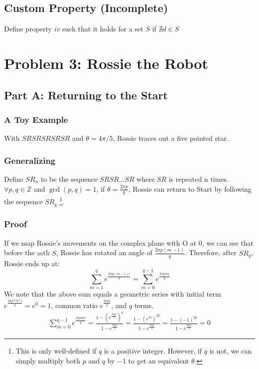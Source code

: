 \documentclass{article}
\begin{document}
  \subsection{Custom Property (Incomplete)}
  Define property $iv$ such that it holds for a set $S$ if $\nexists d \in S$
  \section{Problem 3: Rossie the Robot}
  \subsection{Part A: Returning to the Start}
  \subsubsection{A Toy Example}
  With $SRSRSRSRSR$ and $\theta = 4\pi/5$, Rossie traces out a five pointed star.
  \subsubsection{Generalizing}
  Define $SR_n$ to be the sequence $SRSR...SR$ where $SR$ is repeated n times. $\forall p, q \in \mathbb{Z}$ and $\gcd(p,q) = 1$, if $\theta = \frac{2\pi p}{q}$, Rossie can return to Start by following the sequence $SR_q$ \footnote{This is only well-defined if $q$ is a positive integer. However, if $q$ is not, we can simply multiply both $p$ and $q$ by $-1$ to get an equivalent $\theta$.}.
  \subsubsection{Proof}
   If we map Rossie's movements on the complex plane with O at 0, we can see that before the $m$th $S$, Rossie has rotated an angle of $\frac{2\pi p(m-1)}{q}$. Therefore, after $SR_q$, Rossie ends up at:
  \begin{equation}
    \sum^{q}_{m=1}e^{\frac{2\pi p(m-1)i}{q}} = \sum^{q-1}_{m=0}e^{\frac{2\pi pmi}{q}}
  \end{equation}
  We note that the above sum equals a geometric series with initial term $e^{\frac{2\pi p*0*i}{q}} = e^0 = 1$, common ratio $e^{\frac{2\pi pi}{q}}$, and $q$ terms.
  \begin{align}
    \sum^{q-1}_{m=0}e^{\frac{2\pi pmi}{q}} = \frac{1-(e^{\frac{2\pi pi}{q}})^q}{1-e^{\frac{2\pi pi}{q}}}
    = \frac{1-(e^{\pi i})^{2p}}{1 - e^{\frac{2\pi pi}{q}}}
    = \frac{1-(-1)^{2p}}{1 - e^{\frac{2\pi pi}{q}}}
    = 0
  \end{align}
  
\end{document}
